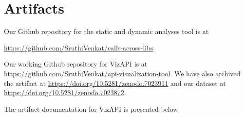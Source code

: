 \chapter{Artifacts}
\label{AppendixA}
Our Github repository for the static and dynamic analyses tool is at 

\href{https://github.com/SruthiVenkat/calls-across-libs}{https://github.com/SruthiVenkat/calls-across-libs}

\noindent
Our working Github repository for VizAPI is at \href{https://github.com/SruthiVenkat/api-visualization-tool}{https://github.com/SruthiVenkat/api-visualization-tool}. We have also archived the artifact at \href{https://doi.org/10.5281/zenodo.7023911}{https://doi.org/10.5281/zenodo.7023911} and our dataset at \href{https://doi.org/10.5281/zenodo.7023872}{https://doi.org/10.5281/zenodo.7023872}.

\noindent
The artifact documentation for VizAPI is presented below.

